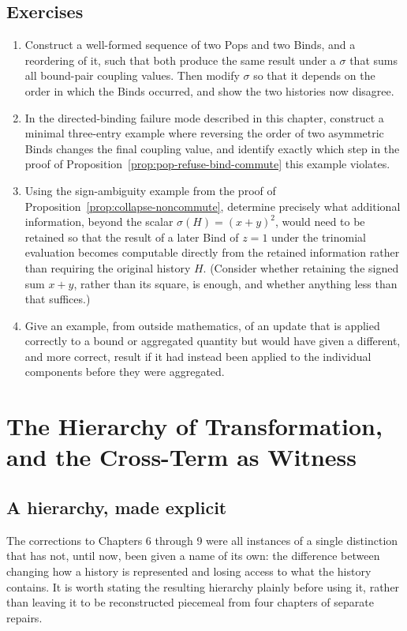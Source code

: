 \documentclass[11pt]{book}
\begin{document}
\section*{Exercises}
\begin{enumerate}
\item Construct a well-formed sequence of two Pops and two Binds, and a reordering of it, such that both produce the same result under a $\sigma$ that sums all bound-pair coupling values. Then modify $\sigma$ so that it depends on the order in which the Binds occurred, and show the two histories now disagree.
\item In the directed-binding failure mode described in this chapter, construct a minimal three-entry example where reversing the order of two asymmetric Binds changes the final coupling value, and identify exactly which step in the proof of Proposition~\ref{prop:pop-refuse-bind-commute} this example violates.
\item Using the sign-ambiguity example from the proof of Proposition~\ref{prop:collapse-noncommute}, determine precisely what additional information, beyond the scalar $\sigma(H)=(x+y)^2$, would need to be retained so that the result of a later Bind of $z=1$ under the trinomial evaluation becomes computable directly from the retained information rather than requiring the original history $H$. (Consider whether retaining the signed sum $x+y$, rather than its square, is enough, and whether anything less than that suffices.)
\item Give an example, from outside mathematics, of an update that is applied correctly to a bound or aggregated quantity but would have given a different, and more correct, result if it had instead been applied to the individual components before they were aggregated.
\end{enumerate}

\chapter{The Hierarchy of Transformation, and the Cross-Term as Witness}

\section{A hierarchy, made explicit}

The corrections to Chapters 6 through 9 were all instances of a single distinction that has not, until now, been given a name of its own: the difference between changing how a history is represented and losing access to what the history contains. It is worth stating the resulting hierarchy plainly before using it, rather than leaving it to be reconstructed piecemeal from four chapters of separate repairs.
\end{document}
